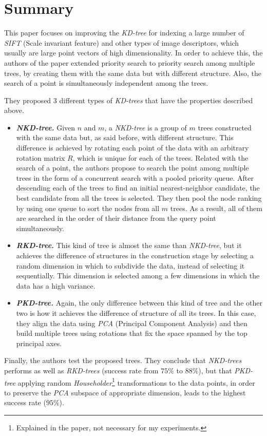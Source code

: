 \section{Summary}
This paper focuses on improving the \textit{KD-tree} for indexing a large number of \textit{SIFT} (Scale invariant feature) and other types of image descriptors, which usually are large point vectors of high dimensionality.  In order to achieve this, the authors of the paper extended priority search to priority search among multiple trees, by creating them with the same data but with different structure. Also, the search of a point is simultaneously independent among the trees.

They proposed 3 different types of \textit{KD-trees} that have the properties described above.
\begin{itemize}
    \item \textit{\textbf{NKD-tree.}} Given $n$ and $m$, a \textit{NKD-tree} is a group of $m$ trees constructed with the same data but, as said before, with different structure. This difference is achieved by rotating each point of the data with an arbitrary rotation matrix $R$, which is unique for each of the trees. Related with the search of a point, the authors propose to search the point among multiple trees in the form of a concurrent search with a pooled priority queue. After descending each of the trees to find an initial nearest-neighbor candidate, the best candidate from all the trees is selected. They then pool the node ranking by using one queue to sort the nodes from all $m$ trees. As a result, all of them are searched in the order of their distance from the query point simultaneously.
    \item \textit{\textbf{RKD-tree.}} This kind of tree is almost the same than \textit{NKD-tree}, but it achieves the difference of structures in the construction stage by selecting a random dimension in which to subdivide the data, instead of selecting it sequentially. This dimension is selected among a few dimensions in which the data has a high variance.
    \item \textit{\textbf{PKD-tree.}} Again, the only difference between this kind of tree and the other two is how it achieves the difference of structure of all its trees. In this case, they align the data using \textit{PCA} (Principal Component Analysis) and then build multiple trees using rotations that fix the space spanned by the top principal axes.
\end{itemize}

Finally, the authors test the proposed trees. They conclude that \textit{NKD-trees} performs as well as \textit{RKD-trees} (success rate from $75\%$ to $88\%$), but that \textit{PKD-tree} applying random \textit{Householder}\footnote{Explained in the paper, not necessary for my experiments.} transformations to the data points, in order to preserve the \textit{PCA} subspace of appropriate dimension, leads to the highest success rate ($95\%$).
